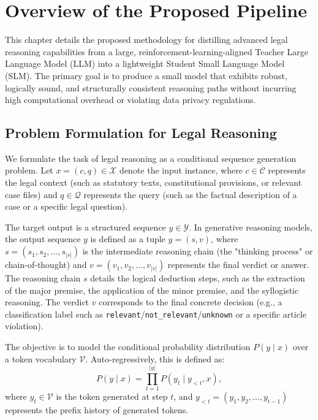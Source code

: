 \section{Overview of the Proposed Pipeline}

This chapter details the proposed methodology for distilling advanced legal reasoning capabilities from a large, reinforcement-learning-aligned Teacher Large Language Model (LLM) into a lightweight Student Small Language Model (SLM). The primary goal is to produce a small model that exhibits robust, logically sound, and structurally consistent reasoning paths without incurring high computational overhead or violating data privacy regulations.

\subsection{Problem Formulation for Legal Reasoning}

We formulate the task of legal reasoning as a conditional sequence generation problem. Let $x = (c, q) \in \mathcal{X}$ denote the input instance, where $c \in \mathcal{C}$ represents the legal context (such as statutory texts, constitutional provisions, or relevant case files) and $q \in \mathcal{Q}$ represents the query (such as the factual description of a case or a specific legal question). 

The target output is a structured sequence $y \in \mathcal{Y}$. In generative reasoning models, the output sequence $y$ is defined as a tuple $y = (s, v)$, where $s = (s_1, s_2, \dots, s_{|s|})$ is the intermediate reasoning chain (the "thinking process" or chain-of-thought) and $v = (v_1, v_2, \dots, v_{|v|})$ represents the final verdict or answer. The reasoning chain $s$ details the logical deduction steps, such as the extraction of the major premise, the application of the minor premise, and the syllogistic reasoning. The verdict $v$ corresponds to the final concrete decision (e.g., a classification label such as \texttt{relevant}/\texttt{not\_relevant}/\texttt{unknown} or a specific article violation).

The objective is to model the conditional probability distribution $P(y \mid x)$ over a token vocabulary $\mathcal{V}$. Auto-regressively, this is defined as:
\begin{equation}
    P(y \mid x) = \prod_{t=1}^{|y|} P(y_t \mid y_{<t}, x),
\end{equation}
where $y_t \in \mathcal{V}$ is the token generated at step $t$, and $y_{<t} = (y_1, y_2, \dots, y_{t-1})$ represents the prefix history of generated tokens. 

